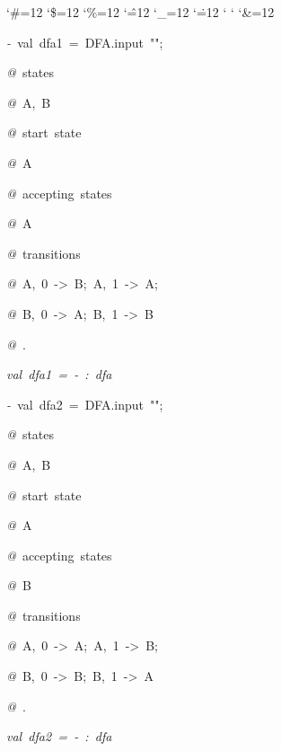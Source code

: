 \begin{list}{}
{\setlength{\leftmargin}{\leftmargini}
\setlength{\rightmargin}{0cm}
\setlength{\itemindent}{0cm}
\setlength{\listparindent}{0cm}
\setlength{\itemsep}{0cm}
\setlength{\parsep}{0cm}
\setlength{\labelsep}{0cm}
\setlength{\labelwidth}{0cm}
\catcode`\#=12
\catcode`\$=12
\catcode`\%=12
\catcode`\^=12
\catcode`\_=12
\catcode`\.=12
\catcode`
\catcode`
\catcode`\&=12
\ttfamily}
\small
\item[]\textsl{-\ }val\ dfa1\ =\ DFA.input\ "";
\item[]\textsl{@\ }states
\item[]\textsl{@\ }A,\ B
\item[]\textsl{@\ }start\ state
\item[]\textsl{@\ }A
\item[]\textsl{@\ }accepting\ states
\item[]\textsl{@\ }A
\item[]\textsl{@\ }transitions
\item[]\textsl{@\ }A,\ 0\ ->\ B;\ A,\ 1\ ->\ A;
\item[]\textsl{@\ }B,\ 0\ ->\ A;\ B,\ 1\ ->\ B
\item[]\textsl{@\ }.
\item[]\textsl{val\ dfa1\ =\ -\ :\ dfa}
\item[]\textsl{-\ }val\ dfa2\ =\ DFA.input\ "";
\item[]\textsl{@\ }states
\item[]\textsl{@\ }A,\ B
\item[]\textsl{@\ }start\ state
\item[]\textsl{@\ }A
\item[]\textsl{@\ }accepting\ states
\item[]\textsl{@\ }B
\item[]\textsl{@\ }transitions
\item[]\textsl{@\ }A,\ 0\ ->\ A;\ A,\ 1\ ->\ B;
\item[]\textsl{@\ }B,\ 0\ ->\ B;\ B,\ 1\ ->\ A
\item[]\textsl{@\ }.
\item[]\textsl{val\ dfa2\ =\ -\ :\ dfa}
\end{list}
